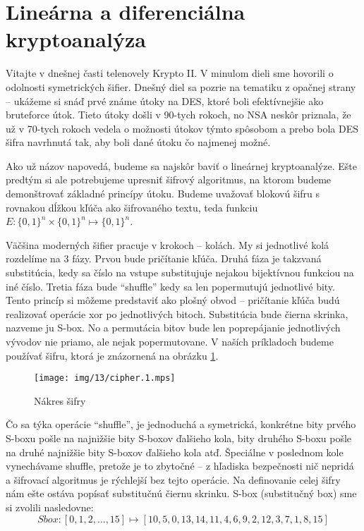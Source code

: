 \section{Lineárna a diferenciálna kryptoanalýza}

Vitajte v dnešnej časti telenovely Krypto II. V minulom dieli sme
hovorili o odolnosti symetrických šifier. Dnešný diel sa pozrie na
tematiku z opačnej strany -- ukážeme si snáď prvé známe útoky na DES,
ktoré boli efektívnejšie ako bruteforce útok. Tieto útoky došli v
90-tych rokoch, no NSA neskôr priznala, že už v 70-tych rokoch vedela
o možnosti útokov týmto spôsobom a prebo bola DES šifra navrhnutá tak,
aby boli dané útoku čo najmenej možné.

Ako už názov napovedá, budeme sa najskôr baviť o lineárnej
kryptoanalýze. Ešte predtým si ale potrebujeme upresniť šifrový
algoritmus, na ktorom budeme demonštrovať základné princípy útoku.
Budeme uvažovať blokovú šifru s rovnakou dĺžkou kľúča ako šifrovaného
textu, teda funkciu $E:\{0,1\}^n \times \{0,1\}^n \mapsto \{0,1\}^n$.

Väčšina moderných šifier pracuje v krokoch -- kolách.
My si jednotlivé kolá rozdelíme na 3 fázy. Prvou bude pričítanie
kľúča.
Druhá fáza je takzvaná substitúcia, kedy sa číslo na vstupe substitujuje
nejakou bijektívnou funkciou na iné číslo.
Tretia fáza bude ``shuffle'' kedy sa len popermutujú jednotlivé bity.
Tento princíp si môžeme predstaviť ako plošný obvod -- pričítanie
kľúča budú realizovať operácie xor po jednotlivých bitoch.
Substitúcia bude čierna skrinka, nazveme ju S-box. No a permutácia
bitov bude len poprepájanie jednotlivých vývodov nie priamo, ale nejak
popermutovane. V naších príkladoch budeme používať šifru, ktorá je
znázornená na obrázku \ref{fig:cipher}.

\begin{figure}[h]
    \centering
    \texttt{[image: img/13/cipher.1.mps]}
    \label{fig:cipher}
    \caption{Nákres šifry}
\end{figure}

Čo sa týka operácie ``shuffle'', je jednoduchá a symetrická, konkrétne
bity prvého S-boxu pošle na najnižšie bity S-boxov ďalšieho kola,
bity druhého S-boxu pošle na druhé najnižšie bity S-boxov ďalšieho
kola atď. Špeciálne v poslednom kole vynechávame shuffle, pretože je
to zbytočné -- z hľadiska bezpečnosti nič nepridá a šifrovací
algoritmus je rýchlejší bez tejto operácie. Na definovanie celej šifry
nám ešte ostáva popísať substitučnú čiernu skrinku.
S-box (substitučný box) sme si zvolili nasledovne:
\begin{equation*}
    Sbox:[0,1,2,\dots,15] \mapsto
    [10, 5, 0, 13, 14, 11, 4, 6, 9, 2, 12, 3, 7, 1, 8, 15]
\end{equation*}

